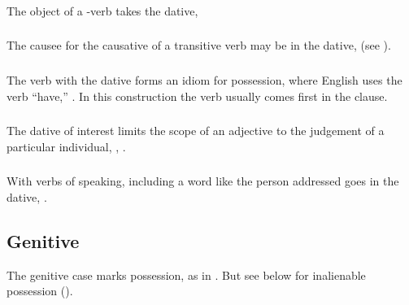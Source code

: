 \subsubsection{} The object of a -verb takes the dative,   \label{syn:case:dative-si}

\subsubsection{} The causee for the causative of a transitive verb may
be in the dative,   (see ). 

\subsubsection{} The verb  with the dative forms an idiom for
possession, where English uses the verb ``have,'' 
.  In this construction the verb usually comes
first in the clause.  

\subsubsection{} The dative of interest limits the scope of an
adjective to the judgement  of a particular
individual,  ,
 .

\subsubsection{} With verbs of speaking, including a word like
  the person addressed goes in the dative,  .

\subsection{Genitive} The genitive case marks possession, as in
 . But see below for
inalienable possession ().

